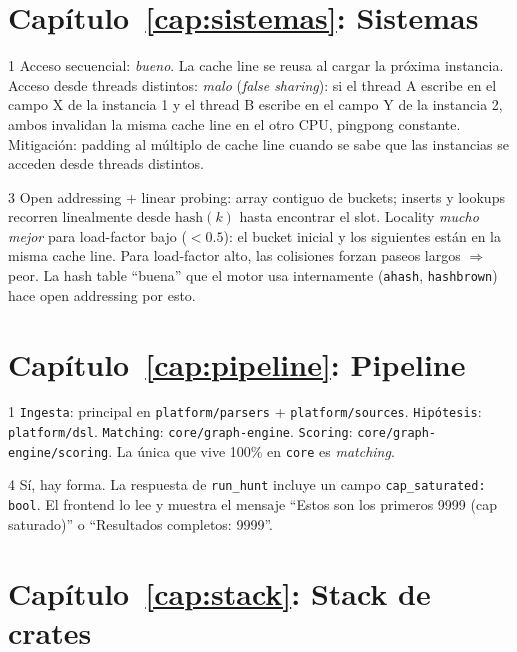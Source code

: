 \section*{Capítulo~\ref{cap:sistemas}: Sistemas}

\begin{solucion}{1}
Acceso secuencial: \emph{bueno}. La cache line se reusa al cargar
la próxima instancia. Acceso desde threads distintos: \emph{malo}
(\emph{false sharing}): si el thread A escribe en el campo X de la
instancia 1 y el thread B escribe en el campo Y de la instancia 2,
ambos invalidan la misma cache line en el otro CPU, pingpong
constante. Mitigación: padding al múltiplo de cache line cuando
se sabe que las instancias se acceden desde threads distintos.
\end{solucion}

\begin{solucion}{3}
Open addressing + linear probing: array contiguo de buckets;
inserts y lookups recorren linealmente desde \(\mathrm{hash}(k)\)
hasta encontrar el slot. Locality \emph{mucho mejor} para
load-factor bajo (\(< 0.5\)): el bucket inicial y los
siguientes están en la misma cache line. Para load-factor alto, las
colisiones forzan paseos largos $\Rightarrow$ peor. La hash table
``buena'' que el motor usa internamente (\texttt{ahash},
\texttt{hashbrown}) hace open addressing por esto.
\end{solucion}

\section*{Capítulo~\ref{cap:pipeline}: Pipeline}

\begin{solucion}{1}
\texttt{Ingesta}: principal en \texttt{platform/parsers} +
\texttt{platform/sources}. \texttt{Hipótesis}: \texttt{platform/dsl}.
\texttt{Matching}: \texttt{core/graph-engine}. \texttt{Scoring}:
\texttt{core/graph-engine/scoring}. La única que vive 100\% en
\texttt{core} es \emph{matching}.
\end{solucion}

\begin{solucion}{4}
Sí, hay forma. La respuesta de \texttt{run\_hunt} incluye un campo
\texttt{cap\_saturated: bool}. El frontend lo lee y muestra el
mensaje ``Estos son los primeros 9999 (cap saturado)'' o
``Resultados completos: 9999''.
\end{solucion}

\section*{Capítulo~\ref{cap:stack}: Stack de crates}

